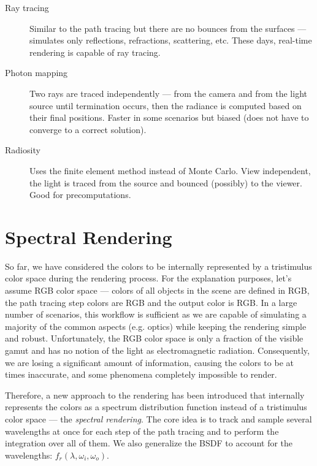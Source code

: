 \begin{description}
	\item[Ray tracing]\cite{glassner1989introduction} Similar to the path tracing but there are no bounces from the surfaces --- simulates only reflections, refractions, scattering, etc. These days, real-time rendering is capable of ray tracing.
	\item[Photon mapping]\cite{jensen2001realistic} Two rays are traced independently --- from the camera and from the light source until termination occurs, then the radiance is computed based on their final positions. Faster in some scenarios but biased (does not have to converge to a correct solution).
	\item[Radiosity]\cite{sillion1994radiosity}Uses the finite element method instead of Monte Carlo. View independent, the light is traced from the source and bounced (possibly) to the viewer. Good for precomputations. 
\end{description}

\section{Spectral Rendering}

So far, we have considered the colors to be internally represented by a tristimulus color space during the rendering process. For the explanation purposes, let's assume RGB color space --- colors of all objects in the scene are defined in RGB, the path tracing step colors are RGB and the output color is RGB. In a large number of scenarios, this workflow is sufficient as we are capable of simulating a majority of the common aspects (e.g. optics) while keeping the rendering simple and robust. Unfortunately, the RGB color space is only a fraction of the visible gamut and has no notion of the light as electromagnetic radiation. Consequently, we are losing a significant amount of information, causing the colors to be at times inaccurate, and some phenomena completely impossible to render. 

Therefore, a new approach to the rendering has been introduced that internally represents the colors as a spectrum distribution function instead of a tristimulus color space --- the \emph{spectral rendering}. The core idea is to track and sample several wavelengths at once for each step of the path tracing and to perform the integration over all of them. We also generalize the BSDF to account for the wavelengths: $f_r(\lambda,\omega_i,\omega_o)$.

